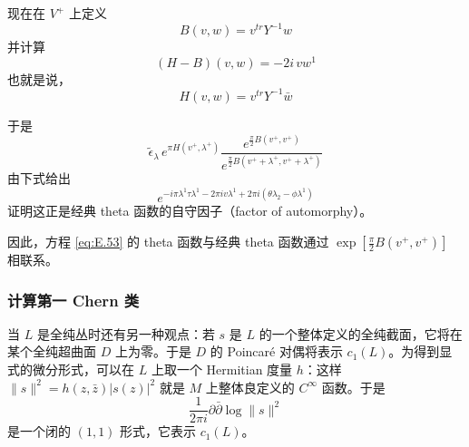 现在在 $V^+$ 上定义
\begin{equation}
  B(v,w) = v^{tr}Y^{-1}w
  \tag{E.56}
  \label{eq:E.56}
\end{equation}
并计算
\begin{equation}
  (H - B)(v,w) = -2i\,v w^1
  \tag{E.57}
  \label{eq:E.57}
\end{equation}
也就是说，
\begin{equation}
  H(v,w) = v^{tr}Y^{-1}\bar w
  \tag{E.58}
  \label{eq:E.58}
\end{equation}


于是
\begin{equation}
  \tilde\epsilon_\lambda\,e^{\pi H(v^+,\lambda^+)}
  \frac{e^{\frac{\pi}{2}B(v^+,v^+)}}
       {e^{\frac{\pi}{2}B(v^+ + \lambda^+,v^+ + \lambda^+)}}
  \tag{E.59}
  \label{eq:E.59}
\end{equation}
由下式给出
\begin{equation}
  e^{-i\pi\lambda^1\tau\lambda^1 - 2\pi i v\lambda^1 + 2\pi i(\theta\lambda_2 - \phi\lambda^1)}
  \tag{E.60}
  \label{eq:E.60}
\end{equation}
证明这正是经典 theta 函数的自守因子（factor of automorphy）。

因此，方程 \eqref{eq:E.53} 的 theta 函数与经典 theta 函数通过 $\exp[\frac{\pi}{2}B(v^+,v^+)]$ 相联系。

\subsubsection{计算第一 Chern 类} %

当 $L$ 是全纯丛时还有另一种观点：若 $s$ 是 $L$ 的一个整体定义的全纯截面，它将在某个全纯超曲面 $D$ 上为零。于是 $D$ 的 Poincaré 对偶将表示 $c_1(L)$。为得到显式的微分形式，可以在 $L$ 上取一个 Hermitian 度量 $h$：这样 $\|s\|^2 = h(z,\bar z)|s(z)|^2$ 就是 $M$ 上整体良定义的 $C^\infty$ 函数。于是
\begin{equation}
  \frac{1}{2\pi i}\partial\bar\partial\log\|s\|^2
  \tag{E.61}
  \label{eq:E.61}
\end{equation}
是一个闭的 $(1,1)$ 形式，它表示 $c_1(L)$。

